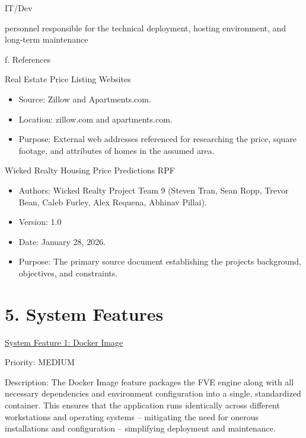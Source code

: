 IT/Dev

personnel responsible for the technical deployment, hosting environment,
and long-term maintenance

f. References

Real Estate Price Listing Websites

\begin{itemize}
\item
  Source: Zillow and Apartments.com.
\end{itemize}

\begin{itemize}
\item
  Location: zillow.com and apartments.com.
\end{itemize}

\begin{itemize}
\item
  Purpose: External web addresses referenced for researching the price,
  square footage, and attributes of homes in the assumed area.
\end{itemize}

Wicked Realty Housing Price Predictions RPF

\begin{itemize}
\item
  Authors: Wicked Realty Project Team 9 (Steven Tran, Sean Ropp, Trevor
  Bean, Caleb Furley, Alex Requena, Abhinav Pillai).
\item
  Version: 1.0
\item
  Date: January 28, 2026.
\item
  Purpose: The primary source document establishing the
  project\textquotesingle s background, objectives, and constraints.
\end{itemize}

\hypertarget{system-features}{%
\section{5. System Features}\label{system-features}}

\ul{System Feature 1: Docker Image}

Priority: MEDIUM

Description: The Docker Image feature packages the FVE engine along with
all necessary dependencies and environment configuration into a single,
standardized container. This ensures that the application runs
identically across different workstations and operating systems --
mitigating the need for onerous installations and configuration --
simplifying deployment and maintenance.


